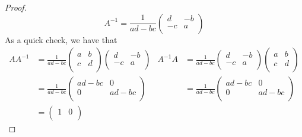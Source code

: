 \documentclass[../psets.tex]{subfiles}
\begin{document}
\begin{enumerate}
\begin{proof}
        \begin{equation*}
            \boxed{
                A^{-1} = \frac{1}{ad-bc}
                \begin{pmatrix}
                    d & -b\\
                    -c & a\\
                \end{pmatrix}
            }
        \end{equation*}
        As a quick check, we have that
        \begin{align*}
            AA^{-1} &= \frac{1}{ad-bc}
            \begin{pmatrix}
                a & b\\
                c & d\\
            \end{pmatrix}
            \begin{pmatrix}
                d & -b\\
                -c & a\\
            \end{pmatrix}&
                A^{-1}A &= \frac{1}{ad-bc}
                \begin{pmatrix}
                    d & -b\\
                    -c & a\\
                \end{pmatrix}
                \begin{pmatrix}
                    a & b\\
                    c & d\\
                \end{pmatrix}\\
            &= \frac{1}{ad-bc}
            \begin{pmatrix}
                ad-bc & 0\\
                0 & ad-bc\\
            \end{pmatrix}&
                &= \frac{1}{ad-bc}
                \begin{pmatrix}
                    ad-bc & 0\\
                    0 & ad-bc\\
                \end{pmatrix}\\
            &=
            \begin{pmatrix}
                1 & 0\\

\end{pmatrix}
\end{align*}
\end{proof}
\end{enumerate}
\end{document}
